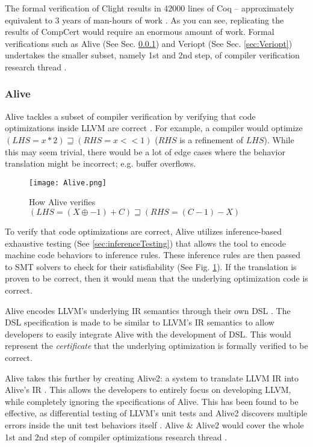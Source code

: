 The formal verification of Clight results in 42000 lines of Coq -- approximately equivalent to 3 years of man-hours 
of work \cite[Sec. 3.3]{compcertVerification}. As you can see, replicating the results of CompCert would require an enormous amount of work.
Formal verifications such as Alive (See Sec. \ref{sec:Alive}) and Veriopt (See Sec. \ref{sec:Veriopt}) undertakes the smaller subset, 
namely 1st and 2nd step, of compiler verification research thread \cite{CompilerOptimization}.

\subsubsection{Alive}
\label{sec:Alive}

Alive tackles a subset of compiler verification by verifying that code optimizations inside LLVM are correct \cite{AliveInLean}. For example, 
a compiler would optimize \((LHS = x * 2) \sqsupseteq (RHS = x << 1)\) (\(RHS\) is a refinement of \(LHS\)). While this may seem trivial, there would 
be a lot of edge cases where the behavior translation might be incorrect; e.g. buffer overflows.

\begin{figure}[ht]
    \centering
    \texttt{[image: Alive.png]}
    \caption{How Alive verifies \((LHS = (X \oplus -1) + C) \sqsupseteq (RHS = (C-1) - X)\) \cite[pp. 1]{AliveInLean}}
    \label{fig:AliveSystem}
\end{figure}

To verify that code optimizations are correct, Alive utilizes inference-based exhaustive testing (See \ref{sec:inferenceTesting}) that allows 
the tool to encode machine code behaviors to inference rules. These inference rules are then passed to SMT solvers to check for their satisfiability 
(See Fig. \ref{fig:AliveSystem}). If the translation is proven to be correct, then it would mean that the underlying optimization code is correct.

Alive encodes LLVM's \cite{llvm} underlying IR semantics through their own DSL \cite[Fig. 1]{AliveInLean}. The DSL specification is made to be 
similar to LLVM's IR semantics to allow developers to easily integrate Alive with the development of DSL. This would represent the 
\emph{certificate} that the underlying optimization is formally verified to be correct.

Alive takes this further by creating Alive2: a system to translate LLVM IR into Alive's IR \cite{Alive2}. This allows the developers to entirely 
focus on developing LLVM, while completely ignoring the specifications of Alive. This has been found to be effective, as differential testing of 
LLVM's unit tests and Alive2 discovers multiple errors inside the unit test behaviors itself \cite[Sec. 8.2]{Alive2}. Alive \& Alive2 would cover 
the whole 1st and 2nd step of compiler optimizations research thread \cite[pp. 5]{CompilerOptimization}.

